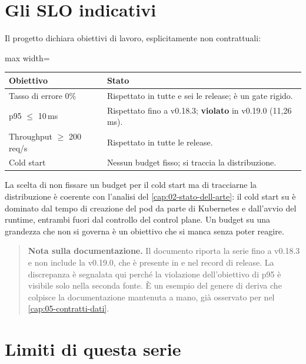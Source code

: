 \section{Gli SLO indicativi}

Il progetto dichiara obiettivi di lavoro, esplicitamente non contrattuali:

\begin{center}
\small
\begin{adjustbox}{max width=\textwidth}
\begin{tabular}{@{}lp{7.6cm}@{}}
\toprule
\textbf{Obiettivo} & \textbf{Stato} \\
\midrule
Tasso di errore 0\% & Rispettato in tutte e sei le release; \`e un gate rigido. \\
p95 $\leq$ 10\,ms & Rispettato fino a v0.18.3; \textbf{violato} in v0.19.0
(11{,}26\,ms). \\
Throughput $\geq$ 200 req/s & Rispettato in tutte le release. \\
Cold start & Nessun budget fisso; si traccia la distribuzione. \\
\bottomrule
\end{tabular}
\end{adjustbox}
\end{center}

La scelta di non fissare un budget per il cold start ma di tracciarne la
distribuzione \`e coerente con l'analisi del \cref{cap:02-stato-dell-arte}: il
cold start su \nf{} \`e dominato dal tempo di creazione del pod da parte di
Kubernetes e dall'avvio del runtime, entrambi fuori dal controllo del control
plane. Un budget su una grandezza che non si governa \`e un obiettivo che si
manca senza poter reagire.

\begin{quote}
\textbf{Nota sulla documentazione.} Il documento  riporta la
serie fino a v0.18.3 e non include la v0.19.0, che \`e presente in
 e nel record di release. La discrepanza \`e
segnalata qui perch\'e la violazione dell'obiettivo di p95 \`e visibile solo nella
seconda fonte. \`E un esempio del genere di deriva che colpisce la
documentazione mantenuta a mano, gi\`a osservato per  nel
\cref{cap:05-contratti-dati}.
\end{quote}

\section{Limiti di questa serie}

